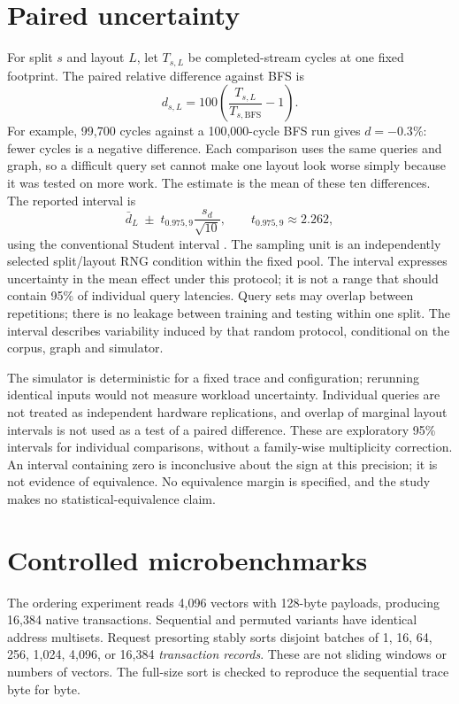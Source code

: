 \documentclass[11pt,a4paper]{report}
\begin{document}
\section{Paired uncertainty}
For split $s$ and layout $L$, let $T_{s,L}$ be completed-stream cycles at one fixed footprint. The paired relative difference against BFS is
\begin{equation}
 d_{s,L}=100\left(\frac{T_{s,L}}{T_{s,\mathrm{BFS}}}-1\right).
\end{equation}
For example, 99,700 cycles against a 100,000-cycle BFS run gives $d=-0.3\%$: fewer cycles is a negative difference. Each comparison uses the same queries and graph, so a difficult query set cannot make one layout look worse simply because it was tested on more work. The estimate is the mean of these ten differences. The reported interval is
\begin{equation}
 \bar d_L\;\pm\;t_{0.975,9}\frac{s_d}{\sqrt{10}},\qquad t_{0.975,9}\approx2.262,
\end{equation}
using the conventional Student interval \cite{student}. The sampling unit is an independently selected split/layout RNG condition within the fixed pool. The interval expresses uncertainty in the mean effect under this protocol; it is not a range that should contain 95\% of individual query latencies. Query sets may overlap between repetitions; there is no leakage between training and testing within one split. The interval describes variability induced by that random protocol, conditional on the corpus, graph and simulator.

The simulator is deterministic for a fixed trace and configuration; rerunning identical inputs would not measure workload uncertainty. Individual queries are not treated as independent hardware replications, and overlap of marginal layout intervals is not used as a test of a paired difference. These are exploratory 95\% intervals for individual comparisons, without a family-wise multiplicity correction. An interval containing zero is inconclusive about the sign at this precision; it is not evidence of equivalence. No equivalence margin is specified, and the study makes no statistical-equivalence claim.

\section{Controlled microbenchmarks}
The ordering experiment reads 4,096 vectors with 128-byte payloads, producing 16,384 native transactions. Sequential and permuted variants have identical address multisets. Request presorting stably sorts disjoint batches of 1, 16, 64, 256, 1,024, 4,096, or 16,384 \emph{transaction records}. These are not sliding windows or numbers of vectors. The full-size sort is checked to reproduce the sequential trace byte for byte.
\end{document}
